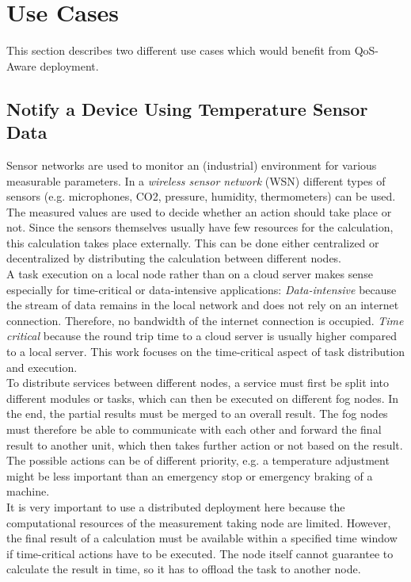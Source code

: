 \chapter{Use Cases\label{cha:use-cases}}

This section describes two different use cases which would benefit from QoS-Aware deployment.

\section{Notify a Device Using Temperature Sensor Data\label{sec:sensordata}}

Sensor networks are used to monitor an (industrial) environment for various measurable parameters. In a \textit{wireless sensor network} (WSN) different types of sensors (e.g. microphones, CO2, pressure, humidity, thermometers) can be used. The measured values are used to decide whether an action should take place or not. Since the sensors themselves usually have few resources for the calculation, this calculation takes place externally. This can be done either centralized or decentralized by distributing the calculation between different nodes.\\

A task execution on a local node rather than on a cloud server makes sense especially for time-critical or data-intensive applications:
\textit{Data-intensive} because the stream of data remains in the local network and does not rely on an internet connection.
Therefore, no bandwidth of the internet connection is occupied.
\textit{Time critical} because the round trip time to a cloud server is usually higher compared to a local server. This work focuses on the time-critical aspect of task distribution and execution.\\

To distribute services between different nodes, a service must first be split into different modules or tasks, which can then be executed on different fog nodes.
In the end, the partial results must be merged to an overall result.
The fog nodes must therefore be able to communicate with each other and forward the final result to another unit, which then takes further action or not based on the result.
The possible actions can be of different priority, e.g. a temperature adjustment might be less important than an emergency stop or emergency braking of a machine.\\

It is very important to use a distributed deployment here because the computational resources of the measurement taking node are limited.
However, the final result of a calculation must be available within a specified time window if time-critical actions have to be executed.
The node itself cannot guarantee to calculate the result in time, so it has to offload the task to another node.\\

